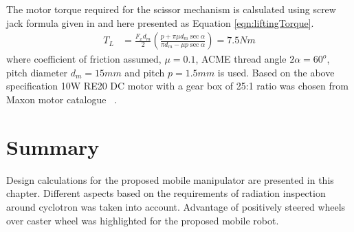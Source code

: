 The motor torque required for the scissor mechanism is calsulated using  screw jack formula given in  \cite{TOMBook} and here presented as Equation \ref{eqn:liftingTorque}. 
\begin{equation}
\label{eqn:liftingTorque}
\begin{aligned}
T_L&=\frac{F_x d_m}{2}(\frac{p+\pi\mu d_m\sec\alpha}{\pi d_m-\mu p\sec \alpha})=7.5Nm
\end{aligned}
\end{equation}
where coefficient of friction assumed, $\mu=0.1$, ACME thread angle $2\alpha=60^o$, pitch diameter $d_m=15mm$ and pitch $p=1.5mm$ is used. Based on the above specification 10W RE20 DC motor with a gear box of 25:1 ratio was chosen from Maxon motor catalogue ~\cite{catMaxon}.



  
  

\section{Summary}
Design calculations for the proposed  mobile manipulator are presented in this chapter. Different aspects based on the requirements of radiation inspection around cyclotron was taken into account. Advantage of positively steered wheels over caster wheel was highlighted for the proposed mobile robot. 

